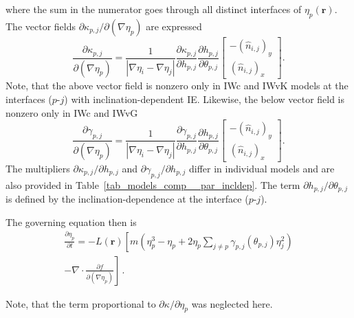 		where the sum in the numerator goes through all distinct interfaces of $\eta_p(\bm{r})$. The vector fields $\partial\kappa_{p,j}/\partial (\nabla\eta_p)$ are expressed
		\begin{equation} \label{eq_dkppijdGp}
			\frac{\partial \kappa_{p,j}}{\partial (\nabla\eta_p)} = \frac{1}{|\nabla\eta_i-\nabla\eta_j|}\frac{\partial \kappa_{p,j}}{\partial h_{p,j}}\frac{\partial h_{p,j}}{\partial \theta_{p,j}} \left[\begin{array}{c}
				-(\hat{n}_{i,j})_y   \\
				(\hat{n}_{i,j})_x
			\end{array} \right].
		\end{equation}
		Note, that the above vector field is nonzero only in IWc and IWvK models at the interfaces ($p$-$j$) with inclination-dependent IE. Likewise, the below vector field is nonzero only in IWc and IWvG
		\begin{equation} \label{eq_dgmmijdGp}
			\frac{\partial \gamma_{p,j}}{\partial (\nabla\eta_p)} = \frac{1}{|\nabla\eta_i-\nabla\eta_j|}\frac{\partial \gamma_{p,j}}{\partial h_{p,j}}\frac{\partial h_{p,j}}{\partial \theta_{p,j}} \left[\begin{array}{c}
				-(\hat{n}_{i,j})_y   \\
				(\hat{n}_{i,j})_x
			\end{array} \right].
		\end{equation}
		The multipliers $\partial \kappa_{p,j}/\partial h_{p,j}$ and $\partial \gamma_{p,j}/\partial h_{p,j}$ differ in individual models and are also provided in Table~\ref{tab_models_comp__par_incldep}. The term $\partial h_{p,j}/\partial \theta_{p,j}$ is defined by the inclination-dependence at the interface ($p$-$j$).
		
		The governing equation then is
		\begin{equation}
			\begin{split}
				\frac{\partial \eta_p}{\partial t} = -L(\bm{r})\left[ m\left( \eta_p^3-\eta_p +  2\eta_p\sum_{j\neq p}\gamma_{p,j}(\theta_{p,j})\eta_j^2 \right) \right. \\ 
				\left.  -\nabla\cdot \frac{\partial f}{\partial(\nabla \eta_p)} \right] \,.
			\end{split}
		\end{equation}
		
		Note, that the term proportional to $\partial \kappa/\partial\eta_p$ was neglected here. 
		
